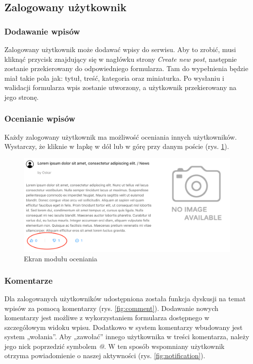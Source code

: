 \documentclass[declaration,shortabstract,polish,inz]{iithesis}
\begin{document}
\subsection{Zalogowany użytkownik}

\subsubsection{Dodawanie wpisów}
Zalogowany użytkownik może dodawać wpisy do serwisu. Aby to zrobić, musi kliknąć przycisk znajdujący się w nagłówku strony \textit{Create new post}, następnie zostanie przekierowany do odpowiedniego formularza. Tam do wypełnienia będzie miał takie pola jak: tytuł, treść, kategoria oraz miniaturka. Po wysłaniu i walidacji formularza wpis zostanie utworzony, a użytkownik przekierowany na jego stronę.

\subsubsection{Ocenianie wpisów}
Każdy zalogowany użytkownik ma możliwość oceniania innych użytkowników. Wystarczy, że kliknie w łapkę w dół lub w górę przy danym poście (rys. \ref{fig:like}).
\begin{figure}[H]
    \centering
    \includegraphics[width=\linewidth]{images/like.png}
    \caption{Ekran modułu oceniania}
    \label{fig:like}
\end{figure}

\subsubsection{Komentarze}
Dla zalogowanych użytkowników udostępniona została funkcja dyskusji na temat wpisów za pomocą komentarzy (rys. \ref{fig:comment}). Dodawanie nowych komentarzy jest możliwe z wykorzystaniem formularza dostępnego w szczegółowym widoku wpisu. Dodatkowo w system komentarzy wbudowany jest system „wołania”. Aby „zawołać” innego użytkownika w treści komentarza, należy jego nick poprzedzić symbolem \textit{@}. W ten sposób wspomniany użytkownik otrzyma powiadomienie o naszej aktywności (rys. \ref{fig:notification}).
\end{document}
